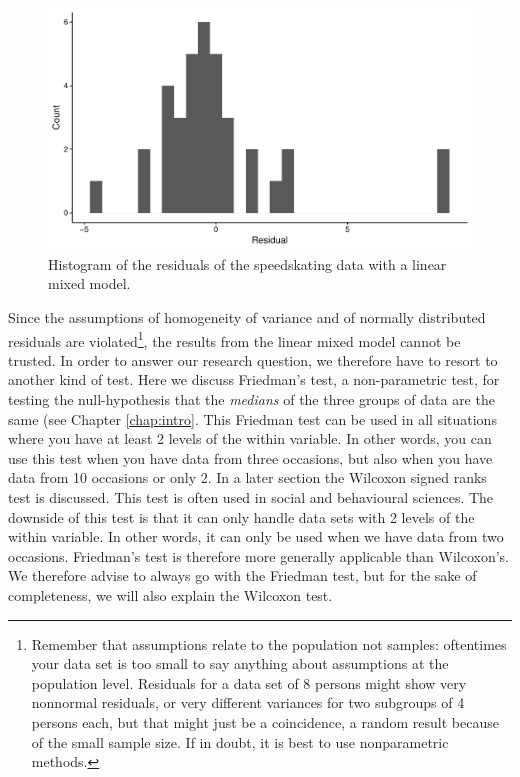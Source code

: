 \documentclass[]{book}\usepackage[]{graphicx}\usepackage[]{color}
\makeatletter
\def\maxwidth{ %
  \ifdim\Gin@nat@width>\linewidth
    \linewidth
  \else
    \Gin@nat@width
  \fi
}
\newenvironment{knitrout}{}{} %
\makeatother
\begin{document}
\begin{knitrout}
\color{fgcolor}\begin{figure}

{\centering \includegraphics[width=\maxwidth]{figure/nonparmixed_3-1} 

}

\caption[Histogram of the residuals of the speedskating data with a linear mixed model]{Histogram of the residuals of the speedskating data with a linear mixed model.}\label{fig:nonparmixed_3}
\end{figure}


\end{knitrout}
Since the assumptions of homogeneity of variance and of normally distributed residuals are violated\footnote{Remember that assumptions relate to the population not samples: oftentimes your data set is too small to say anything about assumptions at the population level. Residuals for a data set of 8 persons might show very nonnormal residuals, or very different variances for two subgroups of 4 persons each, but that might just be a coincidence, a random result because of the small sample size. If in doubt, it is best to use nonparametric methods.}, the results from the linear mixed model cannot be trusted. In order to answer our research question, we therefore have to resort to another kind of test. Here we discuss Friedman's test, a non-parametric test, for testing the null-hypothesis that the \textit{medians} of the three groups of data are the same (see Chapter \ref{chap:intro}. This Friedman test can be used in all situations where you have at least 2 levels of the within variable. In other words, you can use this test when you have data from three occasions, but also when you have data from 10 occasions or only 2. In a later section the Wilcoxon signed ranks test is discussed. This test is often used in social and behavioural sciences. The downside of this test is that it can only handle data sets with 2 levels of the within variable. In other words, it can only be used when we have data from two occasions. Friedman's test is therefore more generally applicable than Wilcoxon's. We therefore advise to always go with the Friedman test, but for the sake of completeness, we will also explain the Wilcoxon test.
\end{document}
